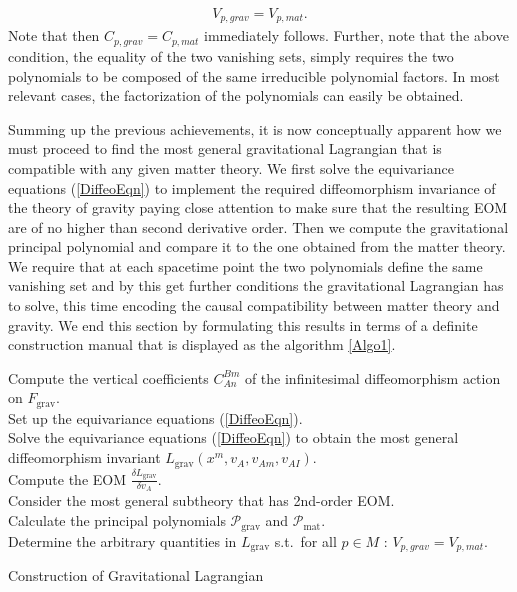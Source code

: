 \begin{align}
    V_{p,grav} = V_{p,mat}.
\end{align}
Note that then $C_{p,grav} = C_{p,mat}$ immediately follows. Further, note that the above condition, the equality of the two vanishing sets, simply requires the two polynomials to be composed of the same irreducible polynomial factors. In most relevant cases, the factorization of the polynomials can easily be obtained.


Summing up the previous achievements, it is now conceptually apparent how we must proceed to find the most general gravitational Lagrangian that is compatible with any given matter theory. We first solve the equivariance equations (\ref{DiffeoEqn}) to implement the required diffeomorphism invariance of the theory of gravity paying close attention to make sure that the resulting EOM are of no higher than second derivative order. Then we compute the gravitational principal polynomial and compare it to the one obtained from the matter theory. We require that at each spacetime point the two polynomials define the same vanishing set and by this get further conditions the gravitational Lagrangian has to solve, this time encoding the causal compatibility between matter theory and gravity.
We end this section by formulating this results in terms of a definite construction manual that is displayed as the algorithm \ref{Algo1}.
\begin{algorithm}[hbt!]
\SetAlgoLined
{}
Compute the vertical coefficients $C^{Bm}_{An}$ of the infinitesimal diffeomorphism action on $F_{\text{grav}}$. \\
Set up the equivariance equations (\ref{DiffeoEqn}). \\
Solve the equivariance equations (\ref{DiffeoEqn}) to obtain the most general diffeomorphism invariant $L_{\text{grav}}(x^m,v_A,v_{Am},v_{AI})$.\\
Compute the EOM $\frac{\delta L_{\text{grav}}}{\delta v_A}$.\\
Consider the most general subtheory that has 2nd-order EOM.\\
Calculate the principal polynomials $\mathcal{P}_{\text{grav}}$ and $\mathcal{P}_{\text{mat}}$.\\
Determine the arbitrary quantities in $L_{\text{grav}}$ s.t.\ for all $p \in M$ : $V_{p,grav} = V_{p,mat}.$
 \caption{Construction of Gravitational Lagrangian}\label{Algo1}
\end{algorithm}

